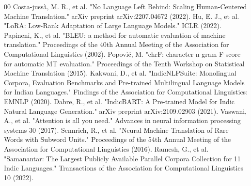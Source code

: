 \documentclass[conference]{IEEEtran}
\begin{document}
\begin{thebibliography}{00}
 Costa-jussà, M. R., et al. "No Language Left Behind: Scaling Human-Centered Machine Translation." arXiv preprint arXiv:2207.04672 (2022).
 Hu, E. J., et al. "LoRA: Low-Rank Adaptation of Large Language Models." ICLR (2022).
 Papineni, K., et al. "BLEU: a method for automatic evaluation of machine translation." Proceedings of the 40th Annual Meeting of the Association for Computational Linguistics (2002).
 Popovi\'{c}, M. "chrF: character n-gram F-score for automatic MT evaluation." Proceedings of the Tenth Workshop on Statistical Machine Translation (2015).
 Kakwani, D., et al. "IndicNLPSuite: Monolingual Corpora, Evaluation Benchmarks and Pre-trained Multilingual Language Models for Indian Languages." Findings of the Association for Computational Linguistics: EMNLP (2020).
 Dabre, R., et al. "IndicBART: A Pre-trained Model for Indic Natural Language Generation." arXiv preprint arXiv:2109.02903 (2021).
 Vaswani, A., et al. "Attention is all you need." Advances in neural information processing systems 30 (2017).
 Sennrich, R., et al. "Neural Machine Translation of Rare Words with Subword Units." Proceedings of the 54th Annual Meeting of the Association for Computational Linguistics (2016).
 Ramesh, G., et al. "Samanantar: The Largest Publicly Available Parallel Corpora Collection for 11 Indic Languages." Transactions of the Association for Computational Linguistics 10 (2022).
\end{thebibliography}
\end{document}

